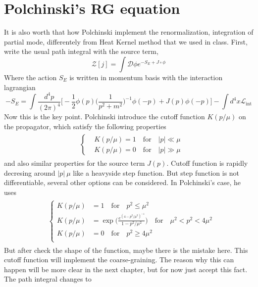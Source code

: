 \documentclass[12pt,halfline,a4paper]{ouparticle}
\begin{document}
\section{Polchinski's RG equation}
It is also worth that how Polchinski implement the renormalization, integration of partial mode, differentely from Heat Kernel method that we used in class.
First, write the usual path integral with the source term,
\begin{equation}
	\mathcal Z[j]=\int\mathcal D \phi e^{-S_E+J\circ\phi}
\end{equation}
Where the action $S_E$ is written in momentum basis with the interaction lagrangian
\begin{equation}
	-S_E=\int \frac{d^4p}{(2\pi)^4}\big[-\frac{1}{2}\phi(p)\bigg(\frac{1}{p^2+m^2}\bigg)^{-1}\phi(-p)+J(p)\phi(-p)\bigg]-\int d^4x \mathcal L_\text{int}
\end{equation}
Now this is the key point. Polchinski introduce the cutoff function $K(p/\mu)$ on the propagator, which satisfy the following properties
\begin{align}\begin{split}
	&\left\{
	\begin{aligned}
		&K(p/\mu)=1\quad\text{for}\quad |p|\ll\mu\\
		&K(p/\mu)=0\quad\text{for}\quad |p|\gg\mu
	\end{aligned}
	\right.
\end{split}\end{align}
and also similar properties for the source term $J(p)$.
Cutoff function is rapidly decresing around $|p|~\mu$ like a heavyside step function. But step function is not differentiable, several other options can be considered.
In Polchinski's case, he uses
\begin{align}\begin{split}
	&\left\{
		\begin{aligned}
	K(p/\mu)&=1\quad \text{for} \quad p^2\leq\mu^2\\
	K(p/\mu)&=\exp\big(\frac{e^{(4-p^2/\mu^2)^{-1}}}{1-p^2/\mu^2}\big)\quad \text{for} \quad \mu^2<p^2<4\mu^2\\
	K(p/\mu)&=0\quad \text{for} \quad p^2\geq 4\mu^2\\
\end{aligned}
\right.
\end{split}\end{align}
But after check the shape of the function, maybe there is the mistake here. This cutoff function will implement the coarse-graining. The reason why this can happen will be more clear in the next chapter, but for now just accept this fact. The path integral changes to
\end{document}
